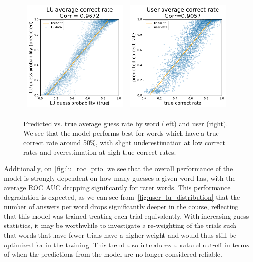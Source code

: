 \begin{figure}[ht]
\centering
\begin{tabular}{cc}
\includegraphics[width=0.4\linewidth]{figures/lingvist/lu_correct_rate.pdf} &
\includegraphics[width=0.4\linewidth]{figures/lingvist/user_correct_rate.pdf} \\
\end{tabular}
\caption{Predicted vs. true average guess rate by word (left) and user (right). We see that the model performs best for words which have a true correct rate around 50\%, with slight underestimation at low correct rates and overestimation at high true correct rates.}
\label{fig:user_lu_correct_rate}
\end{figure}

Additionally, on~\cref{fig:lu_roc_prio} we see that the overall performance of the model is strongly dependent on how many guesses a given word has, with the average ROC AUC dropping significantly for rarer words. This performance degradation is expected, as we can see from~\cref{fig:user_lu_distribution} that the number of answers per word drops significantly deeper in the course, reflecting that this model was trained treating each trial equivalently. With increasing guess statistics, it may be worthwhile to investigate a re-weighting of the trials such that words that have fewer trials have a higher weight and would thus still be optimized for in the training. This trend also introduces a natural cut-off in terms of when the predictions from the model are no longer considered reliable.

